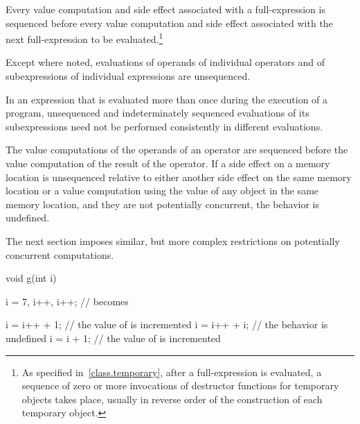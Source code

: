 \pnum
Every
%
value computation and
%
side effect associated with a full-expression is
sequenced before every value computation and side effect associated with the
next full-expression to be evaluated.\footnote{As specified
in~\ref{class.temporary}, after a full-expression is evaluated, a sequence of
zero or more invocations of destructor functions for temporary objects takes
place, usually in reverse order of the construction of each temporary object.}

\pnum
{}%
Except where noted, evaluations of operands of individual operators and
of subexpressions of individual expressions are unsequenced. \begin{note}
In an expression that is evaluated more than once during the execution
of a program, unsequenced and indeterminately sequenced evaluations of
its subexpressions need not be performed consistently in different
evaluations. \end{note} The value computations of the operands of an
operator are sequenced before the value computation of the result of the
operator. If a
%
side effect on a memory location is unsequenced
relative to either another side effect on the same memory location or
a value computation using the value of any object in the same memory location,
and they are not potentially concurrent,
the behavior is undefined.
\begin{note}
The next section imposes similar, but more complex restrictions on
potentially concurrent computations.
\end{note}

\begin{example}

\begin{codeblock}
void g(int i) {
  i = 7, i++, i++;    //  becomes 

  i = i++ + 1;        // the value of  is incremented
  i = i++ + i;        // the behavior is undefined
  i = i + 1;          // the value of  is incremented
}
\end{codeblock}
\end{example}

